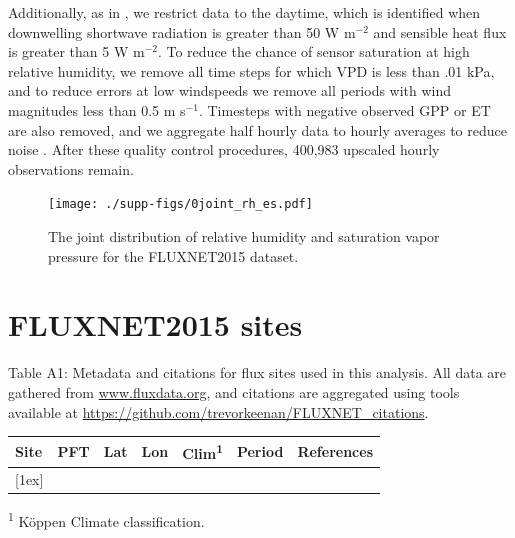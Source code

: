 \documentclass[12pt]{article}
\begin{document}
Additionally, as in \citet{Lin_2018}, we restrict data to the daytime,
which is identified when downwelling shortwave radiation is greater
than 50 W m$^{-2}$ and sensible heat flux is greater than 5 W
m$^{-2}$. To reduce the chance of sensor saturation at high relative
humidity, we remove all time steps for which VPD is less than .01 kPa,
and to reduce errors at low windspeeds we remove all periods with wind
magnitudes less than 0.5 m s$^{-1}$. Timesteps with negative observed
GPP or ET are also removed, and we aggregate half hourly data to
hourly averages to reduce noise \citep{Lin_2018}.  After these quality
control procedures, 400,983 upscaled hourly observations remain.


\begin{figure}
  \centering \texttt{[image: ./supp-figs/0joint\_rh\_es.pdf]}
  \caption{The joint distribution of relative humidity and saturation
    vapor pressure for the FLUXNET2015 dataset.}
  \end{figure}




\section{FLUXNET2015 sites}
  Table A1: Metadata and citations for flux sites used in this analysis. All data are gathered from \url{www.fluxdata.org}, and citations are aggregated using tools available at \url{https://github.com/trevorkeenan/FLUXNET_citations}.
  \begin{longtable}{l l l l l l l}
    \hline
    \textbf{Site} &
    \textbf{PFT} &
    \textbf{Lat} &
    \textbf{Lon} &
    \textbf{Clim\textsuperscript{1}} &
    \textbf{Period} &
    \textbf{References} \\
    [0.5ex]
    \hline
    
    [1ex]
  \end{longtable}
\textsuperscript{1} K{\"o}ppen Climate classification.


\end{document}
